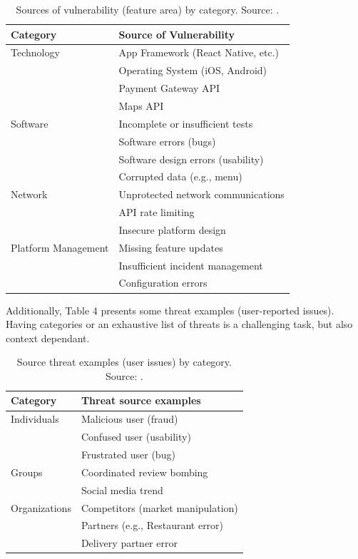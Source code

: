 \documentclass[preprint,10pt]{elsarticle}
\begin{document}
\begin{table}[h!]
    \caption{Sources of vulnerability (feature area) by category. Source: .}
    \label{tab:3}
    \centering
    \begin{tabular}{ll}
        \toprule
        \textbf{Category} & \textbf{Source of Vulnerability} \\
        \midrule
        Technology & App Framework (React Native, etc.) \\
        & Operating System (iOS, Android) \\
        & Payment Gateway API \\
        & Maps API \\
        \addlinespace
        Software & Incomplete or insufficient tests \\
        & Software errors (bugs) \\
        & Software design errors (usability) \\
        & Corrupted data (e.g., menu) \\
        \addlinespace
        Network & Unprotected network communications \\
        & API rate limiting \\
        & Insecure platform design \\
        \addlinespace
        Platform Management & Missing feature updates \\
        & Insufficient incident management \\
        & Configuration errors \\
        \bottomrule
    \end{tabular}
\end{table}

Additionally, Table 4 presents some threat examples (user-reported issues). Having categories or an exhaustive list of threats is a challenging task, but also context dependant.

\begin{table}[h!]
    \caption{Source threat examples (user issues) by category. Source: .}
    \label{tab:4}
    \centering
    \begin{tabular}{ll}
        \toprule
        \textbf{Category} & \textbf{Threat source examples} \\
        \midrule
        Individuals & Malicious user (fraud) \\
        & Confused user (usability) \\
        & Frustrated user (bug) \\
        \addlinespace
        Groups & Coordinated review bombing \\
        & Social media trend \\
        \addlinespace
        Organizations & Competitors (market manipulation) \\
        & Partners (e.g., Restaurant error) \\
        & Delivery partner error \\
        \bottomrule
    \end{tabular}
\end{table}
\end{document}

